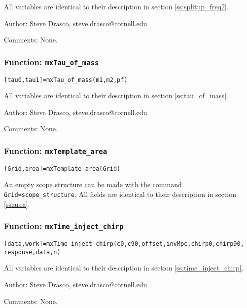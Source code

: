 All variables are identical to their description in section \ref{ss:splitup_freq2}.

\begin{description}
\item{Author:} Steve Drasco, steve.drasco@cornell.edu
\item{Comments:} None.
\end{description}

\subsubsection{Function: {\tt mxTau\_of\_mass}}
\label{sss:mxTau_of_mass}

\texttt{[tau0,tau1]=mxTau\_of\_mass(m1,m2,pf)}

All variables are identical to their description in section \ref{ss:tau_of_mass}.

\begin{description}
\item{Author:} Steve Drasco, steve.drasco@cornell.edu
\item{Comments:} None.
\end{description}

\subsubsection{Function: {\tt mxTemplate\_area}}
\label{sss:mxTemplate_area}

\texttt{[Grid,area]=mxTemplate\_area(Grid)}

An empty scope structure can be made with the command
\texttt{Grid=scope\_structure}. All fields are identical to their
description in section \ref{ss:area}.

\subsubsection{Function: {\tt mxTime\_inject\_chirp}}
\label{sss:mxTime_inject_chirp}

\texttt{[data,work]=mxTime\_inject\_chirp(c0,c90,offset,invMpc,chirp0,chirp90,} \\
\texttt{response,data,n)}

All variables are identical to their description in section \ref{ss:time_inject_chirp}.

\begin{description}
\item{Author:} Steve Drasco, steve.drasco@cornell.edu
\item{Comments:} None.
\end{description}

